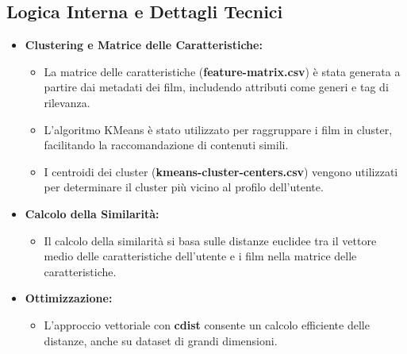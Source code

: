 \documentclass[a4paper,12pt]{article}
\begin{document}
\subsection{Logica Interna e Dettagli Tecnici}
\begin{itemize}
    \item \textbf{Clustering e Matrice delle Caratteristiche: }
    \begin{itemize}
        \item La matrice delle caratteristiche (\textbf{feature-matrix.csv}) è stata generata a partire dai metadati dei film, includendo attributi come generi e tag di rilevanza.
        \item L'algoritmo KMeans è stato utilizzato per raggruppare i film in cluster, facilitando la raccomandazione di contenuti simili.
        \item I centroidi dei cluster (\textbf{kmeans-cluster-centers.csv}) vengono utilizzati per determinare il cluster più vicino al profilo dell'utente.
    \end{itemize}
    \item \textbf{Calcolo della Similarità: }
    \begin{itemize}
        \item Il calcolo della similarità si basa sulle distanze euclidee tra il vettore medio delle caratteristiche dell'utente e i film nella matrice delle caratteristiche.
    \end{itemize}
    \item \textbf{Ottimizzazione: }
    \begin{itemize}
        \item L'approccio vettoriale con \textbf{cdist} consente un calcolo efficiente delle distanze, anche su dataset di grandi dimensioni.
    \end{itemize}
\end{itemize}
\newpage
\end{document}
